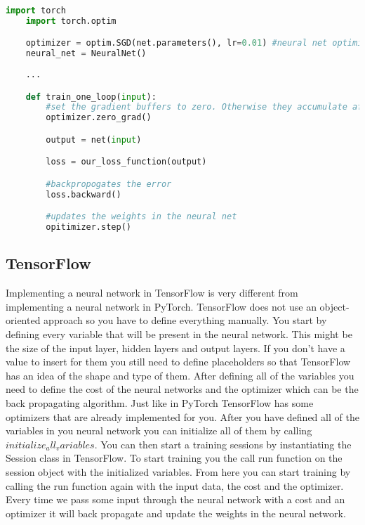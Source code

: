\begin{lstlisting}[language=Python]
	import torch
	import torch.optim

	optimizer = optim.SGD(net.parameters(), lr=0.01) #neural net optimizer using SGD update rules
	neural_net = NeuralNet()
	
	...

	def train_one_loop(input):
		#set the gradient buffers to zero. Otherwise they accumulate after every loop
		optimizer.zero_grad() 

		output = net(input)

		loss = our_loss_function(output)

		#backpropogates the error
		loss.backward() 

		#updates the weights in the neural net
		opitimizer.step() 

\end{lstlisting}

\subsection{TensorFlow}
Implementing a neural network in TensorFlow is very different from implementing a neural network in PyTorch.
TensorFlow does not use an object-oriented approach so you have to define everything manually.
You start by defining every variable that will be present in the neural network.
This might be the size of the input layer, hidden layers and output layers.
If you don't have a value to insert for them you still need to define placeholders so that TensorFlow has an idea of the shape and type of them.
After defining all of the variables you need to define the cost of the neural networks and the optimizer which can be the back propagating algorithm.
Just like in PyTorch TensorFlow has some optimizers that are already implemented for you. 
After you have defined all of the variables in you neural network you can initialize all of them by calling \textit{$initialize_all_variables$}.
You can then start a training sessions by instantiating the Session class in TensorFlow.
To start training you the call run function on the session object with the initialized variables.
From here you can start training by calling the run function again with the input data, the cost and the optimizer.
Every time we pass some input through the neural network with a cost and an optimizer it will back propagate and update the weights in the neural network.

